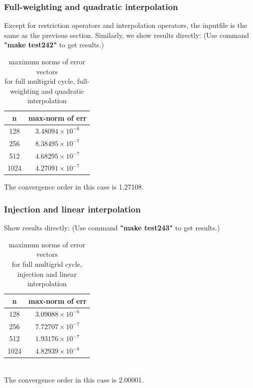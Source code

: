 \documentclass[a4paper,twocolumn]{article}
\theoremstyle{definition}
\begin{document}
\subsubsection{Full-weighting and quadratic interpolation}
Except for restriction operators and interpolation operators, the inputfile is the same as the previous section. Similarly, we show results directly: (Use command \textbf{"make test242"} to get results.)
\newpage
\begin{table}[!htp]
	\centering
	\begin{tabular}{|c|c|}
		\hline	
		n  & max-norm of err \\
		\hline		
		128 & $3.48094\times 10^{-6}$ \\
		\hline		
		256 & $8.38495\times 10^{-7}$ \\
		\hline		
		512 & $4.68295\times 10^{-7}$ \\
		\hline		
		1024 & $4.27091\times 10^{-7}$ \\
		\hline
	\end{tabular}
	\caption{maximum norms of error vectors \\for full multigrid cycle, full-weighting and quadratic interpolation}
\end{table}
\noindent The convergence order in this case is 1.27108.
\subsubsection{Injection and linear interpolation}
Show results directly: (Use command \textbf{"make test243"} to get results.)
\begin{table}[!htp]
	\centering
	\begin{tabular}{|c|c|}
		\hline	
		n  & max-norm of err \\
		\hline		
		128 & $3.09088\times 10^{-6}$ \\
		\hline		
		256 & $7.72707\times 10^{-7}$ \\
		\hline		
		512 & $1.93176\times 10^{-7}$ \\
		\hline		
		1024 & $4.82939\times 10^{-8}$ \\
		\hline
	\end{tabular}
	\caption{maximum norms of error vectors \\for full multigrid cycle, injection and linear interpolation}
\end{table}\\
The convergence order in this case is 2.00001.
\end{document}
